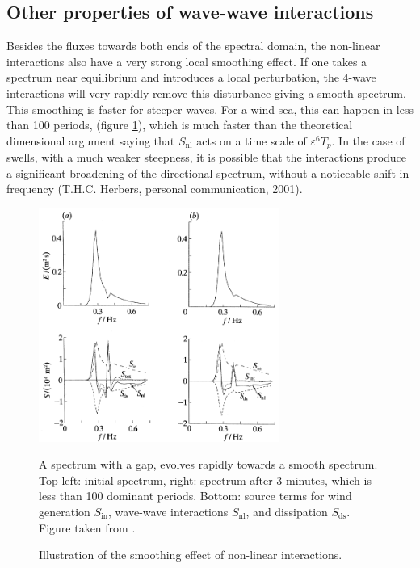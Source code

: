 \subsection{Other properties of wave-wave interactions}
Besides the fluxes towards both ends of the spectral domain, the non-linear interactions
also have a very strong local smoothing effect. If one takes a spectrum near equilibrium and introduces a 
local perturbation, the 4-wave interactions will very rapidly remove this disturbance
giving a smooth spectrum. This smoothing is faster for steeper waves. For a wind sea, this can happen in less than 100 periods,  (figure \ref{fig_YoungVledder}), which is 
much faster than the theoretical dimensional argument saying that $S_{\mathrm{nl}}$ acts on a time scale of $\varepsilon^6 T_p$. In the case of swells, 
with a much weaker steepness, it is possible that the interactions produce a significant broadening of the directional spectrum, without a noticeable shift in 
frequency  (T.H.C. Herbers, personal communication, 2001). 
\begin{figure}[htb]
\centerline{\includegraphics[width=0.70\textwidth]{FIGS_CH_SOURCETERMS/Young_Vledder_1993.png}}
\caption{Illustration of the smoothing effect of non-linear interactions.}{A spectrum with a gap, evolves rapidly 
towards a smooth spectrum. Top-left: initial spectrum, right: spectrum after 3 minutes, which is less than 100 dominant periods. Bottom: 
source terms for wind generation $S_{\mathrm{in}}$, wave-wave interactions $S_{\mathrm{nl}}$, and dissipation $S_{\mathrm{ds}}$. Figure taken from \cite{Young&VanVledder1993}
.} \label{fig_YoungVledder}
\end{figure}

